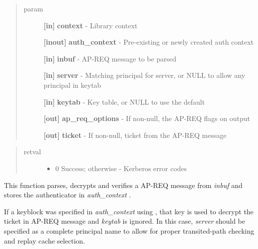 \documentclass[letterpaper,10pt,english]{sphinxmanual}
\begin{document}
\begin{quote}\begin{description}
\item[{param}] \leavevmode
\textbf{{[}in{]}} \textbf{context} - Library context

\textbf{{[}inout{]}} \textbf{auth\_context} - Pre-existing or newly created auth context

\textbf{{[}in{]}} \textbf{inbuf} - AP-REQ message to be parsed

\textbf{{[}in{]}} \textbf{server} - Matching principal for server, or NULL to allow any principal in keytab

\textbf{{[}in{]}} \textbf{keytab} - Key table, or NULL to use the default

\textbf{{[}out{]}} \textbf{ap\_req\_options} - If non-null, the AP-REQ flags on output

\textbf{{[}out{]}} \textbf{ticket} - If non-null, ticket from the AP-REQ message

\end{description}\end{quote}
\begin{quote}\begin{description}
\item[{retval}] \leavevmode\begin{itemize}
\item {} 
0   Success; otherwise - Kerberos error codes

\end{itemize}

\end{description}\end{quote}

This function parses, decrypts and verifies a AP-REQ message from \emph{inbuf} and stores the authenticator in \emph{auth\_context} .

If a keyblock was specified in \emph{auth\_context} using {\hyperref[appdev/refs/api/krb5_auth_con_setuseruserkey:krb5_auth_con_setuseruserkey]{}} , that key is used to decrypt the ticket in AP-REQ message and \emph{keytab} is ignored. In this case, \emph{server} should be specified as a complete principal name to allow for proper transited-path checking and replay cache selection.
\end{document}
